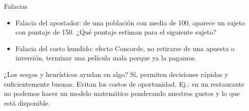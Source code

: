 \documentclass[a4paper,12pt]{article}
\begin{document}
Falacias
\begin{itemize}
	\item Falacia del apostador: de una población con media de 100, aparece un sujeto con puntaje de 150. ¿Qué puntaje estiman para el siguiente sujeto?
	\item Falacia del costo hundido: efecto Concorde, no retirarse de una apuesta o inversión, terminar una película mala porque ya la pagamos.
\end{itemize}

¿Los sesgos y heurísticos ayudan en algo? Sí, permiten decisiones rápidas y suficientemente buenas. Evitan los costos de oportunidad. Ej.: en un restaurante no podemos hacer un modelo matemático ponderando nuestros gustos y lo que está disponible.
\end{document}

